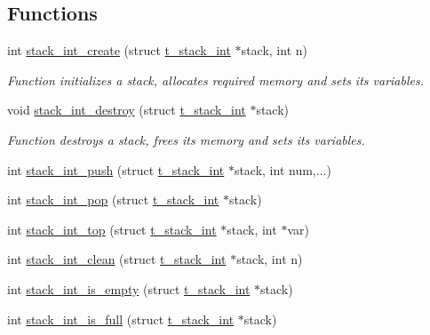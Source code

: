 \subsection*{Functions}
\begin{DoxyCompactItemize}
\item 
int \hyperlink{group__integer__stack_ga93d256313df9cb4749578227e3c99934}{stack\+\_\+int\+\_\+create} (struct \hyperlink{structt__stack__int}{t\+\_\+stack\+\_\+int} $\ast$stack, int n)
\begin{DoxyCompactList}\small\item\em Function initializes a stack, allocates required memory and sets its variables. \end{DoxyCompactList}\item 
void \hyperlink{group__integer__stack_ga52ab40922767807e58ee524b3c20812f}{stack\+\_\+int\+\_\+destroy} (struct \hyperlink{structt__stack__int}{t\+\_\+stack\+\_\+int} $\ast$stack)
\begin{DoxyCompactList}\small\item\em Function destroys a stack, frees its memory and sets its variables. \end{DoxyCompactList}\item 
int \hyperlink{group__integer__stack_gad17b71d019eada66040d7b5dc9559f16}{stack\+\_\+int\+\_\+push} (struct \hyperlink{structt__stack__int}{t\+\_\+stack\+\_\+int} $\ast$stack, int num,...)
\item 
int \hyperlink{group__integer__stack_gab015ac6ee9989efd32ec449066b2de6a}{stack\+\_\+int\+\_\+pop} (struct \hyperlink{structt__stack__int}{t\+\_\+stack\+\_\+int} $\ast$stack)
\item 
int \hyperlink{group__integer__stack_ga4471624bd2826b6451e7af9f36bf6345}{stack\+\_\+int\+\_\+top} (struct \hyperlink{structt__stack__int}{t\+\_\+stack\+\_\+int} $\ast$stack, int $\ast$var)
\item 
int \hyperlink{group__integer__stack_gaa01626cdb65346498926877f4655b741}{stack\+\_\+int\+\_\+clean} (struct \hyperlink{structt__stack__int}{t\+\_\+stack\+\_\+int} $\ast$stack, int n)
\item 
int \hyperlink{group__integer__stack_ga468825317b3ae111b2827a828584e487}{stack\+\_\+int\+\_\+is\+\_\+empty} (struct \hyperlink{structt__stack__int}{t\+\_\+stack\+\_\+int} $\ast$stack)
\item 
int \hyperlink{group__integer__stack_gaa76eeba05823375b6372d41a6d64cb48}{stack\+\_\+int\+\_\+is\+\_\+full} (struct \hyperlink{structt__stack__int}{t\+\_\+stack\+\_\+int} $\ast$stack)
\end{DoxyCompactItemize}


